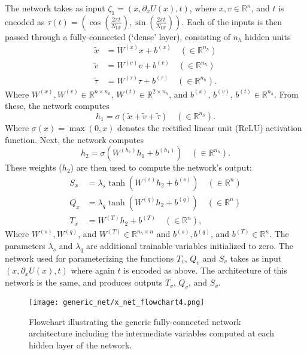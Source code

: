 \documentclass[../main.tex]{subfiles}
\begin{document}
The network takes as input $\zeta_1 = (x, \partial_{x} U(x), t)$, where $x, v
\in \mathbb{R}^{n}$, and $t$ is encoded as $\tau(t) = \left(\cos{(\frac{2\pi
t}{N_{\mathrm{LF}}})},\right.  \left.\sin{(\frac{2\pi
t}{N_{\mathrm{LF}}})}\right)$.
%
Each of the inputs is then passed through a fully-connected (`dense' layer),
consisting of $n_h$ hidden units
%
\begin{align}
    \tilde x &= W^{(x)} x + b^{(x)} \quad (\in \mathbb{R}^{n_h})\\
    \tilde v &= W^{(v)} v + b^{(v)} \quad (\in \mathbb{R}^{n_h})\\
    \tilde \tau &= W^{(\tau)} \tau + b^{(\tau)} \quad (\in \mathbb{R}^{n_h}).
\end{align}
%
Where $W^{(x)}, W^{(v)} \in \mathbb{R}^{n \times n_h}$, $W^{(t)} \in
\mathbb{R}^{2 \times n_h}$, and $b^{(x)}$, $b^{(v)}$,  $b^{(t)} \in
\mathbb{R}^{n_h}$.
%
From these, the network computes
%
\begin{equation}
    h_1 = \sigma(\tilde x + \tilde v + \tilde \tau) \quad (\in
    \mathbb{R}^{n_h}).
    \label{eq:hidden_1}
\end{equation}
%
Where $\sigma(x) = \max(0, x)$ denotes the rectified linear unit (ReLU)
activation function.
%
Next, the network computes
%
\begin{equation}
    h_2 = \sigma\left(W^{(h_1)} h_1 + b^{(h_1)}\right) \quad (\in
    \mathbb{R}^{n_h}).
    \label{eq:hidden_2}
\end{equation}
%
These weights ($h_2$) are then used to compute the network's output:
%
\begin{align}
    S_x &= \lambda_s \tanh(W^{(s)} h_2 + b^{(s)})\quad (\in \mathbb{R}^{n})\\
    Q_x &= \lambda_q \tanh(W^{(q)} h_2 + b^{(q)})\quad (\in \mathbb{R}^{n})\\
    T_x &= W^{(T)} h_2 + b^{(T)}\quad (\in \mathbb{R}^{n}),
\end{align}
%
Where $W^{(s)}, W^{(q)}$, and $W^{(T)} \in \mathbb{R}^{n_h \times n}$ and
$b^{(s)}, b^{(q)}$, and $b^{(T)} \in \mathbb{R}^{n}$.
%
The parameters $\lambda_s$ and $\lambda_q$ are additional trainable variables
initialized to zero.
%
The network used for parameterizing the functions $T_v$, $Q_v$ and $S_v$ takes
as input $(x, \partial_x U(x), t)$ where again $t$ is encoded as above.  The
architecture of this network is the same, and produces outputs $T_v$, $Q_v$,
and $S_v$.

\begin{figure}[htpb]
  \centering
  \texttt{[image: generic\_net/x\_net\_flowchart4.png]}
  \caption{Flowchart illustrating the generic fully-connected network
    architecture including the intermediate variables computed at each hidden
    layer of the network.}%
\label{fig:x_net_flowchart}
\end{figure}
\end{document}

